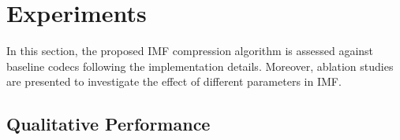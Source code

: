 \section{Experiments} \label{sec: experiments}

In this section, the proposed IMF compression algorithm is assessed against baseline codecs following the implementation details.
Moreover, ablation studies are presented to investigate the effect of different parameters in IMF.

\subsection{Qualitative Performance}

